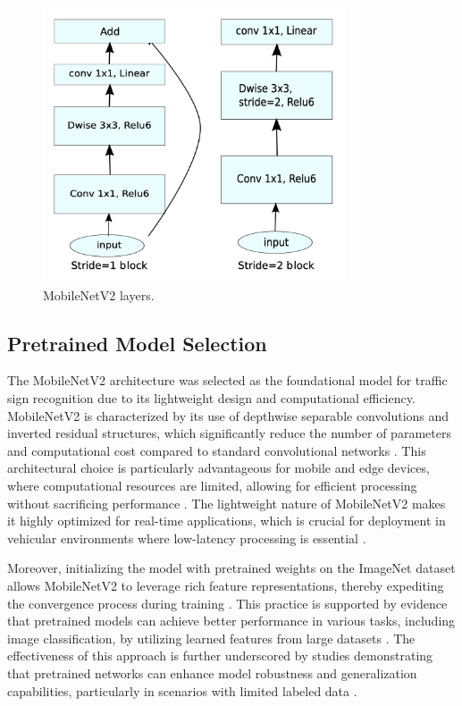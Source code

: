 \begin{figure}[H]
    \centering
    \includegraphics[width=0.8\textwidth]{images/figure5.png}
    \caption{MobileNetV2 layers.}
    \label{fig:fig6}
  \end{figure}

\subsection{Pretrained Model Selection}

The MobileNetV2 architecture was selected as the foundational model for traffic sign recognition due to its lightweight design and computational efficiency. MobileNetV2 is characterized by its use of depthwise separable convolutions and inverted residual structures, which significantly reduce the number of parameters and computational cost compared to standard convolutional networks \cite{10.1109/cvpr.2018.00474}. This architectural choice is particularly advantageous for mobile and edge devices, where computational resources are limited, allowing for efficient processing without sacrificing performance \cite{10.55927/mudima.v3i9.5924}. The lightweight nature of MobileNetV2 makes it highly optimized for real-time applications, which is crucial for deployment in vehicular environments where low-latency processing is essential \cite{10.55927/mudima.v3i9.5924}.

Moreover, initializing the model with pretrained weights on the ImageNet dataset allows MobileNetV2 to leverage rich feature representations, thereby expediting the convergence process during training \cite{10.1167/tvst.9.2.35}. This practice is supported by evidence that pretrained models can achieve better performance in various tasks, including image classification, by utilizing learned features from large datasets \cite{10.1167/tvst.9.2.35,10.48550/arxiv.1909.11229}. The effectiveness of this approach is further underscored by studies demonstrating that pretrained networks can enhance model robustness and generalization capabilities, particularly in scenarios with limited labeled data \cite{10.1101/2023.05.31.23290789}.

